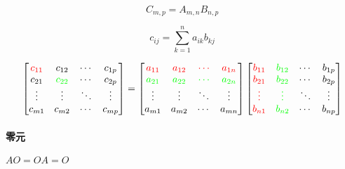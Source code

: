 \documentclass{article}
\begin{document}
\begin{definition}

    \[C_{m,p}=A_{m,n}B_{n,p}\]

    \[c_{ij}=\sum_{k=1}^na_{ik}b_{kj}\]

    \[\begin{bmatrix}
            \textcolor{red}{c_{11}} & c_{12}                    & \cdots & c_{1p} \\
            c_{21}                  & \textcolor{green}{c_{22}} & \cdots & c_{2p} \\
            \vdots                  & \vdots                    & \ddots & \vdots \\
            c_{m1}                  & c_{m2}                    & \cdots & c_{mp} \\
        \end{bmatrix}=
        \begin{bmatrix}
            \textcolor{red}{a_{11}}   & \textcolor{red}{a_{12}}   & \textcolor{red}{\cdots}   & \textcolor{red}{a_{1n}}   \\
            \textcolor{green}{a_{21}} & \textcolor{green}{a_{22}} & \textcolor{green}{\cdots} & \textcolor{green}{a_{2n}} \\
            \vdots                    & \vdots                    & \ddots                    & \vdots                    \\
            a_{m1}                    & a_{m2}                    & \cdots                    & a_{mn}                    \\
        \end{bmatrix}
        \begin{bmatrix}
            \textcolor{red}{b_{11}} & \textcolor{green}{b_{12}} & \cdots & b_{1p} \\
            \textcolor{red}{b_{21}} & \textcolor{green}{b_{22}} & \cdots & b_{2p} \\
            \textcolor{red}{\vdots} & \textcolor{green}{\vdots} & \ddots & \vdots \\
            \textcolor{red}{b_{n1}} & \textcolor{green}{b_{n2}} & \cdots & b_{np} \\
        \end{bmatrix}\]

\end{definition}

\paragraph{零元}$AO=OA=O$
\end{document}
